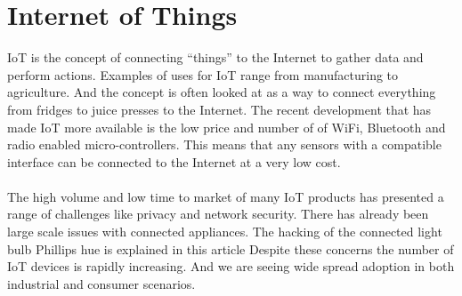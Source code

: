 \documentclass[]{uiophd}
\begin{document}
\section{Internet of Things}
IoT is the concept of connecting “things” to the Internet to gather data and perform actions. Examples of uses for IoT range from manufacturing to agriculture. And the concept is often looked at as a way to connect everything from fridges to juice presses to the Internet. The recent development that has made IoT more available is the low price and number of of WiFi, Bluetooth and radio enabled micro-controllers.  This means that any sensors with a compatible interface can be connected to the Internet at a very low cost.
\\\\
The high volume and low time to market of many IoT products has presented a range of challenges like privacy and network security. There has already been large scale issues with connected appliances. The hacking of the connected light bulb Phillips hue is explained in this article \parencite{6997469} Despite these concerns the number of IoT devices is rapidly increasing. And we are seeing wide spread adoption in both industrial and consumer scenarios. 
\end{document}

